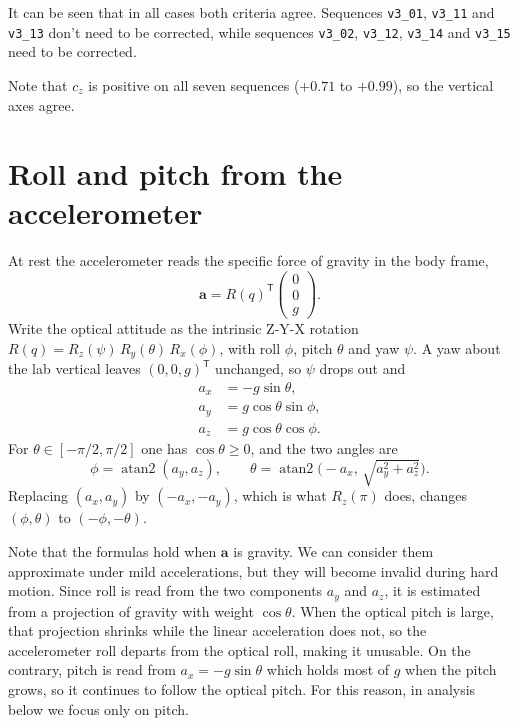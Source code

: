 \documentclass[11pt]{article}
\begin{document}
It can be seen that in all cases both criteria agree.
Sequences \texttt{v3\_01}, \texttt{v3\_11} and \texttt{v3\_13} don't need to be corrected, while
sequences \texttt{v3\_02}, \texttt{v3\_12}, \texttt{v3\_14} and \texttt{v3\_15} need to be corrected.

Note that $c_z$ is positive on all seven sequences ($+0.71$ to $+0.99$), so the vertical axes agree.


\section{Roll and pitch from the accelerometer}
At rest the accelerometer reads the specific force of gravity in the body frame,
\[
  \mathbf{a} = R(q)^{\mathsf T}\begin{pmatrix} 0 \\ 0 \\ g \end{pmatrix}.
\]
Write the optical attitude as the intrinsic Z-Y-X rotation
\(R(q) = R_z(\psi)\,R_y(\theta)\,R_x(\phi)\),
with roll \(\phi\), pitch \(\theta\) and yaw \(\psi\).
A yaw about the lab vertical leaves \((0,0,g)^{\mathsf T}\) unchanged, so \(\psi\) drops out and
\begin{align*}
  a_x &= -g\sin\theta, \\
  a_y &= g\cos\theta\sin\phi, \\
  a_z &= g\cos\theta\cos\phi.
\end{align*}
For \(\theta\in[-\pi/2,\pi/2]\) one has \(\cos\theta\ge 0\), and the two angles are
\begin{equation}
  \phi = \operatorname{atan2}(a_y, a_z),
  \qquad
  \theta = \operatorname{atan2}\bigl(-a_x,\, \sqrt{a_y^2 + a_z^2}\bigr).
  \label{eq:tilt}
\end{equation}
Replacing \((a_x, a_y)\) by \((-a_x, -a_y)\), which is what \(R_z(\pi)\) does, changes \((\phi,
\theta)\) to \((-\phi, -\theta)\).

Note that the formulas hold when \(\mathbf{a}\) is gravity.
We can consider them approximate under mild accelerations, but they will become invalid  during hard
motion.
Since roll is read from the two components $a_y$ and  $a_z$, it is estimated from a projection of
gravity with weight $\cos\theta$.
When the optical pitch is large, that projection shrinks while the linear acceleration does not, so
the accelerometer roll departs from the optical roll, making it unusable.
On the contrary, pitch is read from $a_x = -g\sin\theta$ which holds most of $g$ when the pitch
grows,  so it continues to follow the optical pitch.
For this reason, in analysis below we focus only on pitch.
\end{document}

